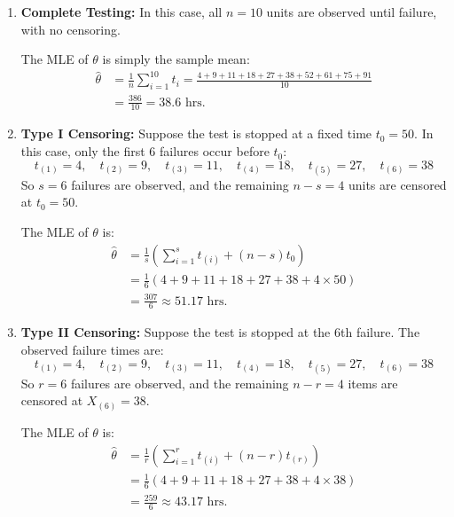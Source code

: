 \documentclass[twoside]{book}
\begin{document}
\begin{enumerate}
  \item \textbf{Complete Testing:} In this case, all $n = 10$ units are observed until failure, with no censoring.

  \medskip

  The MLE of $\theta$ is simply the sample mean:
  \begin{align*}
  \hat{\theta}
    &= \frac{1}{n} \sum_{i=1}^{10} t_i
    = \frac{4 + 9 + 11 + 18 + 27 + 38 + 52 + 61 + 75 + 91}{10}\\
    &= \frac{386}{10}
    = 38.6 \text{ hrs}.
  \end{align*}

  \item \textbf{Type I Censoring:} Suppose the test is stopped at a fixed time $t_0 = 50$. In this case, only the first 6 failures occur before $t_0$:
  \[
  t_{(1)} = 4,\quad t_{(2)} = 9,\quad t_{(3)} = 11,\quad t_{(4)} = 18,\quad t_{(5)} = 27,\quad t_{(6)} = 38
  \]
  So $s = 6$ failures are observed, and the remaining $n - s = 4$ units are censored at $t_0 = 50$.

  \medskip

  The MLE of $\theta$ is:
  \begin{align*}
  \hat{\theta}
    &= \frac{1}{s} \left( \sum_{i=1}^{s} t_{(i)} + (n - s)t_0 \right)\\
    &= \frac{1}{6} \left(4 + 9 + 11 + 18 + 27 + 38 + 4 \times 50 \right)\\
    &= \frac{307}{6} \approx 51.17 \text{ hrs}.
  \end{align*}

  \item \textbf{Type II Censoring:} Suppose the test is stopped at the 6th failure. The observed failure times are:
  \[
  t_{(1)} = 4,\quad t_{(2)} = 9,\quad t_{(3)} = 11,\quad t_{(4)} = 18,\quad t_{(5)} = 27,\quad t_{(6)} = 38
  \]
  So $r = 6$ failures are observed, and the remaining $n - r = 4$ items are censored at $X_{(6)} = 38$.

  \medskip

  The MLE of $\theta$ is:
  \begin{align*}
  \hat{\theta}
    &= \frac{1}{r} \left( \sum_{i=1}^{r} t_{(i)} + (n - r)t_{(r)} \right)\\
    &= \frac{1}{6} \left(4 + 9 + 11 + 18 + 27 + 38 + 4 \times 38 \right)\\
    &= \frac{259}{6} \approx 43.17 \text{ hrs}.
  \end{align*}
\end{enumerate}
\end{document}
